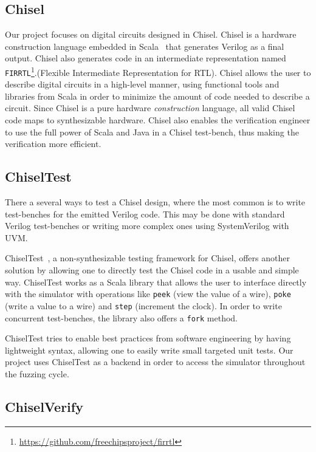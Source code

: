 \documentclass[conference]{IEEEtran}
\begin{document}
\subsection{Chisel}
Our project focuses on digital circuits designed in Chisel.
Chisel is a hardware construction language embedded in Scala~\cite{chisel:dac2012} that generates Verilog as a final output.
Chisel also generates code in an intermediate representation named \texttt{FIRRTL}\footnote{\url{https://github.com/freechipsproject/firrtl}}.(Flexible Intermediate Representation for RTL).
Chisel allows the user to describe digital circuits in a high-level manner, using functional tools and libraries from Scala in order to minimize the amount of code needed to describe a circuit.
Since Chisel is a pure hardware \emph{construction} language, all valid Chisel code maps to synthesizable hardware.
Chisel also enables the verification engineer to use the full power of Scala and Java in a Chisel test-bench, thus making the verification more efficient.

\subsection{ChiselTest}
 
There a several ways to test a Chisel design, where the most common is to write test-benches for the emitted Verilog code.
This may be done with standard Verilog test-benches or writing more complex ones using SystemVerilog with UVM.
 
ChiselTest~\cite{chisel:tester2}, a non-synthesizable testing framework for Chisel, offers another solution by allowing one to directly test the Chisel code in a usable and simple way.
ChiselTest works as a Scala library that allows the user to interface directly with the simulator with operations like \texttt{peek} (view the value of a wire), \texttt{poke} (write a value to a wire) and \texttt{step} (increment the clock).
In order to write concurrent test-benches, the library also offers a \texttt{fork} method.

ChiselTest tries to enable best practices from software engineering by having lightweight syntax, allowing one to easily write small targeted unit tests.
Our project uses ChiselTest as a backend in order to access the simulator throughout the fuzzing cycle.

\subsection{ChiselVerify}
\end{document}
